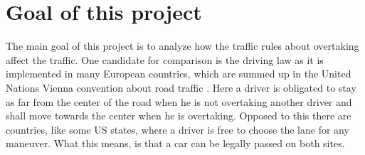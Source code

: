 \section{Goal of this project}
\label{sec:goal}

The main goal of this project is to analyze how the traffic rules about overtaking affect the traffic. One candidate
for comparison is the driving law as it is implemented in many European countries, which are summed up in the United
Nations Vienna convention about road traffic \cite{vienna-treaty}. Here a driver is obligated to stay as far from the
center of the road when he is not overtaking another driver and shall move towards the center when he is overtaking.
Opposed to this there are countries, like some US states, where a driver is free to choose the lane for any maneuver.
What this means, is that a car can be legally passed on both sites. 

